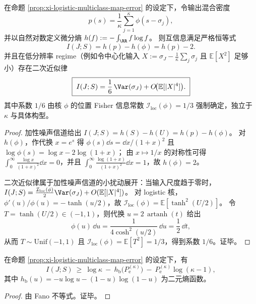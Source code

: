 \begin{proposition}\label{prop:xi-logistic-mutual-information-low-resolution}
在命题 \ref{prop:xi-logistic-multiclass-map-error} 的设定下，令输出混合密度
\[
p(s)=\frac{1}{\kappa}\sum_{j=1}^{\kappa}\phi(s-\sigma_j),
\]
并以自然对数定义微分熵 \(h(f):=-\int_{\RR}f\log f\)。
则互信息满足严格恒等式
\[
\boxed{\;I(J;S)=h(p)-h(\phi)=h(p)-2.\;}
\]
并且在低分辨率 regime（例如令中心化输入 \(X:=\sigma_J-\frac{1}{\kappa}\sum_{j}\sigma_j\) 且 \(\mathbb E[X^{2}]\) 足够小）存在二次近似律
\[
\boxed{\;
I(J;S)=\frac{1}{6}\,\Var(\sigma_J)+O\!\bigl(\mathbb E[|X|^{4}]\bigr).\;}
\]
其中系数 \(1/6\) 由核 \(\phi\) 的位置 Fisher 信息常数 \(\mathcal I_{\mathrm{loc}}(\phi)=1/3\) 强制确定，独立于 \(\kappa\) 与具体构型。
\end{proposition}
\begin{proof}
加性噪声信道给出 \(I(J;S)=h(S)-h(U)=h(p)-h(\phi)\)。
对 \(h(\phi)\)，作代换 \(x=e^{s}\) 得 \(\phi(s)\dd s=\dd x/(1+x)^{2}\) 且
\(
\log\phi(s)=\log x-2\log(1+x)
\)；
由 \(x\mapsto 1/x\) 的对称性可得
\(
\int_{0}^{\infty}\frac{\log x}{(1+x)^{2}}\dd x=0
\)，并且
\(
\int_{0}^{\infty}\frac{\log(1+x)}{(1+x)^{2}}\dd x=1
\)，故 \(h(\phi)=2\)。
\par
二次近似律属于加性噪声信道的小扰动展开：当输入尺度趋于零时，
\(
I(J;S)=\frac{\mathcal I_{\mathrm{loc}}(\phi)}{2}\Var(\sigma_J)+O(\mathbb E[|X|^4])
\)。
对 logistic 核，\(\phi'(u)/\phi(u)=-\tanh(u/2)\)，故
\(
\mathcal I_{\mathrm{loc}}(\phi)=\mathbb E[\tanh^{2}(U/2)]
\)。
令 \(T=\tanh(U/2)\in(-1,1)\)，则代换 \(u=2\,\operatorname{artanh}(t)\) 给出
\[
\phi(u)\,\dd u=\frac{1}{4\cosh^{2}(u/2)}\,\dd u=\frac12\,\dd t,
\]
从而 \(T\sim\mathrm{Unif}(-1,1)\) 且 \(\mathcal I_{\mathrm{loc}}(\phi)=\mathbb E[T^{2}]=1/3\)，得到系数 \(1/6\)。证毕。
\end{proof}

\begin{corollary}\label{cor:xi-logistic-fano-lower-bound-from-error}
在命题 \ref{prop:xi-logistic-multiclass-map-error} 的设定下，有
\[
I(J;S)\ \ge\ \log\kappa\ -\ h_{\mathrm b}\!\bigl(P_{\mathrm e}^{(\kappa)}\bigr)\ -\ P_{\mathrm e}^{(\kappa)}\log(\kappa-1),
\]
其中 \(h_{\mathrm b}(u)=-u\log u-(1-u)\log(1-u)\) 为二元熵函数。
\end{corollary}
\begin{proof}
由 Fano 不等式。证毕。
\end{proof}

